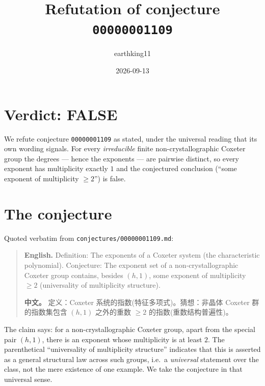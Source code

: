 \documentclass[11pt]{article}
\title{Refutation of conjecture \texttt{00000001109}}
\author{earthking11}
\date{2026-09-13}
\theoremstyle{definition}
\theoremstyle{remark}
\begin{document}
\maketitle

\section*{Verdict: FALSE}

We refute conjecture \texttt{00000001109} as stated, under the universal
reading that its own wording signals. For every \emph{irreducible} finite
non-crystallographic Coxeter group the degrees --- hence the exponents --- are
pairwise distinct, so every exponent has multiplicity exactly $1$ and the
conjectured conclusion (``some exponent of multiplicity $\ge 2$'') is false.

\medskip
\noindent{}

\section{The conjecture}

Quoted verbatim from \texttt{conjectures/00000001109.md}:

\begin{quote}
\textbf{English.} Definition: The exponents of a Coxeter system (the
characteristic polynomial). Conjecture: The exponent set of a
non-crystallographic Coxeter group contains, besides $(h, 1)$, some exponent of
multiplicity $\ge 2$ (universality of multiplicity structure).

\textbf{中文。} 定义：Coxeter 系统的指数(特征多项式)。猜想：非晶体 Coxeter
群的指数集包含 $(h, 1)$ 之外的重数 $\ge 2$ 的指数(重数结构普遍性)。
\end{quote}

The claim says: for a non-crystallographic Coxeter group, apart from the
special pair $(h,1)$, there is an exponent whose multiplicity is at least $2$.
The parenthetical ``universality of multiplicity structure'' indicates that this
is asserted as a general structural law across such groups, i.e.\ a
\emph{universal} statement over the class, not the mere existence of one
example. We take the conjecture in that universal sense.
\end{document}
